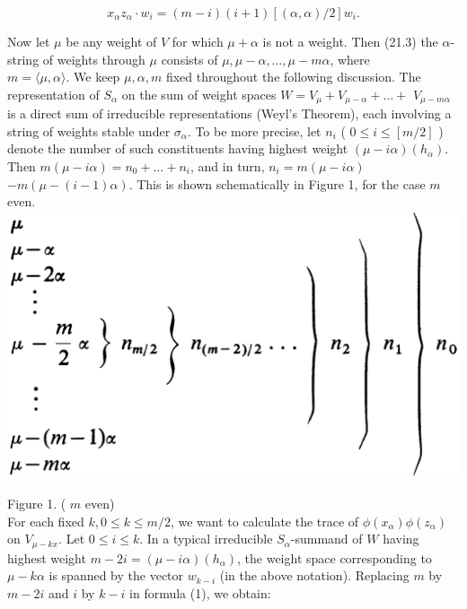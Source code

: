 \documentclass[10pt]{article}
\begin{document}
\begin{equation*}
x_{\alpha} z_{\alpha} \cdot w_{i}=(m-i)(i+1)[(\alpha, \alpha) / 2] w_{i} . \tag{1}
\end{equation*}


Now let $\mu$ be any weight of $V$ for which $\mu+\alpha$ is not a weight. Then (21.3) the $\alpha$-string of weights through $\mu$ consists of $\mu, \mu-\alpha, \ldots, \mu-m \alpha$, where\\
$m=\langle\mu, \alpha\rangle$. We keep $\mu, \alpha, m$ fixed throughout the following discussion. The representation of $S_{\alpha}$ on the sum of weight spaces $W=V_{\mu}+V_{\mu-\alpha}+\ldots+$ $V_{\mu-m \alpha}$ is a direct sum of irreducible representations (Weyl's Theorem), each involving a string of weights stable under $\sigma_{\alpha}$. To be more precise, let $n_{i}$ ( $0 \leq i \leq[m / 2]$ ) denote the number of such constituents having highest weight $(\mu-i \alpha)\left(h_{\alpha}\right)$. Then $m(\mu-i \alpha)=n_{0}+\ldots+n_{i}$, and in turn, $n_{i}=m(\mu-i \alpha)$ $-m(\mu-(i-1) \alpha)$. This is shown schematically in Figure 1, for the case $m$ even.\\
\includegraphics[max width=\textwidth, center]{2025_06_06_fac2836a92464059da43g-133}

Figure 1. ( $m$ even)\\
For each fixed $k, 0 \leq k \leq m / 2$, we want to calculate the trace of $\phi\left(x_{\alpha}\right) \phi\left(z_{\alpha}\right)$ on $V_{\mu-k x}$. Let $0 \leq i \leq k$. In a typical irreducible $S_{\alpha}$-summand of $W$ having highest weight $m-2 i=(\mu-i \alpha)\left(h_{\alpha}\right)$, the weight space corresponding to $\mu-k \alpha$ is spanned by the vector $w_{k-i}$ (in the above notation). Replacing $m$ by $m-2 i$ and $i$ by $k-i$ in formula (1), we obtain:
\end{document}
